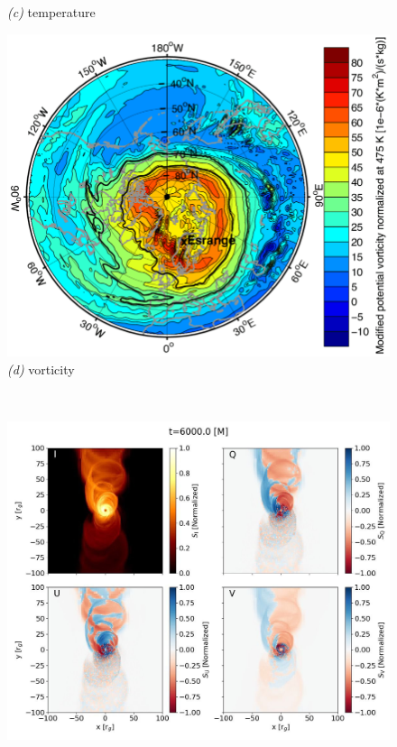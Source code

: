 \documentclass{article}
\newenvironment{hoggfigure}{%
  \begin{figure}[tp]%
    \begin{mdframed}%
    \color{captiongray}}{%
    \end{mdframed}%
  \end{figure}}
\theoremstyle{plain}
\begin{document}
\begin{hoggfigure}
\begin{center}
\begin{minipage}[b]{2.5in}
      \textsl{(c)} temperature
    \end{minipage}
    \begin{minipage}[b]{1.8in}\noindent%
      \includegraphics[width=\textwidth]{The-distribution-of-the-modified-potential-vorticity-at-the-850-K-potential-temperature.png}\\
      \textsl{(d)} vorticity
    \end{minipage}\\[2ex]
    \begin{minipage}[b]{1.9in}\noindent%
      \includegraphics[width=\textwidth]{FbAjqkkWAAANqFc.jpeg}\\

\end{minipage}
\end{center}
\end{hoggfigure}
\end{document}
